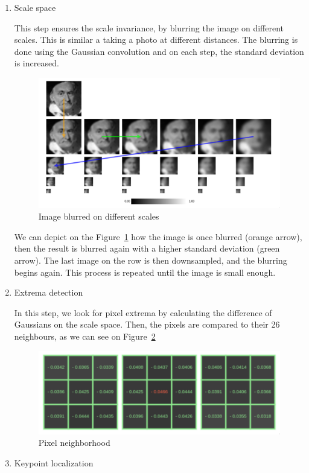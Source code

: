 \documentclass{scrartcl}
\begin{document}
\begin{enumerate}
    \item Scale space

        This step ensures the scale invariance, by blurring the image on different scales. This is similar a taking a photo at different distances. The blurring is done using the Gaussian convolution and on each step, the standard deviation is increased.

        \begin{figure}[H]
            \centering
            \includegraphics[width=0.6\linewidth]{img/sift1}
            \caption{Image blurred on different scales}%
            \label{fig:sift1}
        \end{figure}

        We can depict on the Figure~\ref{fig:sift1} how the image is once blurred (orange arrow), then the result is blurred again with a higher standard deviation (green arrow). The last image on the row is then downsampled, and the blurring begins again. This process is repeated until the image is small enough.

    \item Extrema detection

        In this step, we look for pixel extrema by calculating the difference of Gaussians on the scale space. Then, the pixels are compared to their 26 neighbours, as we can see on Figure~\ref{fig:sift2}

        \begin{figure}[H]
            \centering
            \includegraphics[width=0.5\linewidth]{img/sift2}
            \caption{Pixel neighborhood}%
            \label{fig:sift2}
        \end{figure}

    \item Keypoint localization


\end{enumerate}
\end{document}
